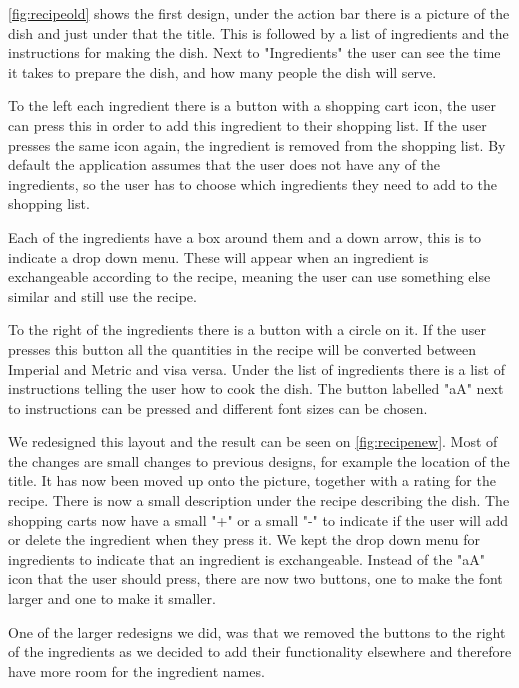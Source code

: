 \autoref{fig:recipeold} shows the first design, under the action bar there is a picture of the dish and just under that the title. This is followed by a list of ingredients and the instructions for making the dish. Next to "Ingredients" the user can see the time it takes to prepare the dish, and how many people the dish will serve.

To the left each ingredient there is a button with a shopping cart icon, the user can press this in order to add this ingredient to their shopping list. If the user presses the same icon again, the ingredient is removed from the shopping list. By default the application assumes that the user does not have any of the ingredients, so the user has to choose which ingredients they need to add to the shopping list.

Each of the ingredients have a box around them and a down arrow, this is to indicate a drop down menu. These will appear when an ingredient is exchangeable according to the recipe, meaning the user can use something else similar and still use the recipe. 

To the right of the ingredients there is a button with a circle on it. If the user presses this button all the quantities in the recipe will be converted between Imperial and Metric and visa versa. Under the list of ingredients there is a list of instructions telling the user how to cook the dish. The button labelled "aA" next to instructions can be pressed and different font sizes can be chosen.

We redesigned this layout and the result can be seen on \autoref{fig:recipenew}. Most of the changes are small changes to previous designs, for example the location of the title. It has now been moved up onto the picture, together with a rating for the recipe. There is now a small description under the recipe describing the dish. The shopping carts now have a small "+" or a small "-" to indicate if the user will add or delete the ingredient when they press it. We kept the drop down menu for ingredients to indicate that an ingredient is exchangeable. Instead of the "aA" icon that the user should press, there are now two buttons, one to make the font larger and one to make it smaller.

One of the larger redesigns we did, was that we removed the buttons to the right of the ingredients as we decided to add their functionality elsewhere and therefore have more room for the ingredient names.

